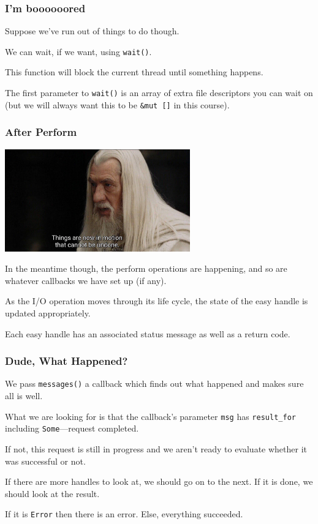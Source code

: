 \begin{frame}
\frametitle{I'm boooooored}

Suppose we've run out of things to do though. 

We can wait, if we want, using \texttt{wait()}. 

This function will block the current thread until something happens.

The first parameter to \texttt{wait()} is an array of extra file descriptors you can wait on (but we will always want this to be \texttt{\&mut []} in this course).


\end{frame}


\begin{frame}
\frametitle{After Perform}

\begin{center}
	\includegraphics[width=0.6\textwidth]{images/events.jpg}
\end{center}


In the meantime though, the perform operations are happening, and so are whatever callbacks we have set up (if any).

As the I/O operation moves through its life cycle, the state of the easy handle is updated appropriately. 

Each easy handle has an associated status message as well as a return code.

\end{frame}


\begin{frame}
\frametitle{Dude, What Happened?}


We pass \texttt{messages()} a callback which finds out what happened and makes sure all is well.

What we are looking for is that the callback's parameter \texttt{msg} has \texttt{result\_for} including \texttt{Some}---request completed. 

If not, this request is still in progress and we aren't ready to evaluate whether it was successful or not. 

If there are more handles to look at, we should go on to the next. If it is done, we should look at the result. 

If it is \texttt{Error} then there is an error. Else, everything succeeded.

\end{frame}


